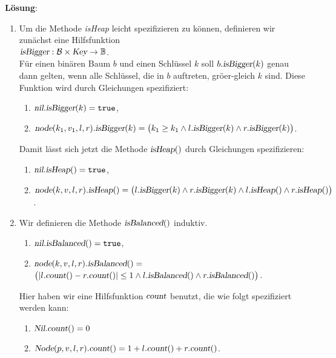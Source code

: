 \documentclass{article}
\begin{document}
\noindent
\textbf{L\"osung}:
\begin{enumerate}
\item Um die Methode \textsl{isHeap} leicht spezifizieren zu k\"onnen, definieren wir zun\"achst
      eine Hilfsfunktion
      \\[0.2cm]
      \hspace*{1.3cm}
      $\textsl{isBigger} : \mathcal{B}  \times \textsl{Key}  \rightarrow \mathbb{B}$.
      \\[0.2cm]
      F\"ur einen bin\"aren Baum $b$ und einen Schl\"ussel $k$ soll $b.\textsl{isBigger}(k)$ genau dann gelten,
      wenn alle Schl\"ussel, die in $b$ auftreten, gr\"o\3er-gleich $k$ sind.
      Diese Funktion wird durch Gleichungen spezifiziert:
      \begin{enumerate}
      \item $\textsl{nil}.\textsl{isBigger}(k) = \mathtt{true}$,
      \item $\textsl{node}(k_1,v_1,l,r).\textsl{isBigger}(k) = \bigl(k_1 \geq k_1 \wedge l.\textsl{isBigger}(k) \wedge r.\textsl{isBigger}(k)\bigr)$.
      \end{enumerate}
      Damit l\"asst sich jetzt die Methode $\textsl{isHeap}()$ durch Gleichungen spezifizieren:
      \begin{enumerate}
      \item $\textsl{nil}.\textsl{isHeap}() = \mathtt{true}$,
      \item $\textsl{node}(k,v,l,r).\textsl{isHeap}() = 
             \bigl(l.\textsl{isBigger}(k) \wedge r.\textsl{isBigger}(k) \wedge l.\textsl{isHeap}() \wedge r.\textsl{isHeap}()\bigr)$.
      \end{enumerate}
\item Wir definieren die Methode $\textsl{isBalanced}()$ induktiv.
      \begin{enumerate}
      \item $\textsl{nil}.\textsl{isBalanced}() = \mathtt{true}$,
      \item $\textsl{node}(k,v,l,r).\textsl{isBalanced}() =$ \\[0.1cm]
            \hspace*{\fill}
            $\bigl(|l.\textsl{count}() - r.\textsl{count}()| \leq 1 
             \wedge l.\textsl{isBalanced}()\wedge r.\textsl{isBalanced}()\bigr)$.
      \end{enumerate}
      Hier haben wir eine Hilfsfunktion $\textsl{count}$ benutzt, die wie folgt spezifiziert werden kann:
      \begin{enumerate}
      \item $\textsl{Nil}.\textsl{count}() = 0$
      \item $\textsl{Node}(p,v,l,r).\textsl{count}() = 1 + l.\textsl{count}() + r.\textsl{count}()$.
      \end{enumerate}
\end{enumerate}
\pagebreak
\end{document}
